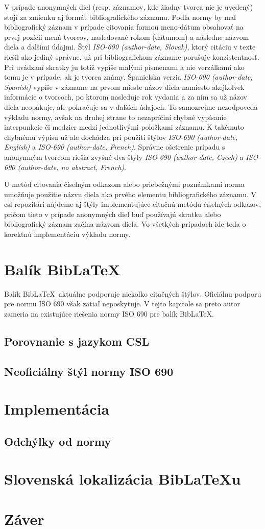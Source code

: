 \documentclass{fithesis3}
\begin{document}
	V prípade anonymných diel (resp. záznamov, kde žiadny tvorca nie je uvedený) stojí za zmienku aj formát bibliografického záznamu. Podľa normy by mal bibliografický záznam v prípade citovania formou meno-dátum obsahovať na prvej pozícii mená tvorcov, nasledované rokom (dátumom) a následne názvom diela a ďalšími údajmi. Štýl \textit{ISO-690 (author-date, Slovak)}, ktorý citáciu v texte riešil ako jediný správne, už pri bibliografickom zázname porušuje konzistentnosť. Pri uvádzaní skratky  ju totiž vypíše malými písmenami a nie verzálkami ako tomu je v prípade, ak je tvorca známy. Španielska verzia \textit{ISO-690 (author-date, Spanish)} vypíše v zázname na prvom mieste názov diela namiesto akejkoľvek informácie o tvorcoch, po ktorom nasleduje rok vydania a za ním sa už názov diela neopakuje, ale pokračuje sa v ďalších údajoch. To samozrejme nezodpovedá výkladu normy, avšak na druhej strane to nezapríčiní chybné vypísanie interpunkcie či medzier medzi jednotlivými položkami záznamu. K takémuto chybnému výpisu už ale dochádza pri použití štýlov \textit{ISO-690 (author-date, English)} a \textit{ISO-690 (author-date, French)}. Správne ošetrenie prípadu s anonymným tvorcom riešia zvyšné dva štýly \textit{ISO-690 (author-date, Czech)} a \textit{ISO-690 (author-date, no abstract, French)}.
	
	U metód citovania číselným odkazom alebo priebežnými poznámkami norma umožňuje použitie názvu diela ako prvého elementu bibliografického záznamu. V csl repozitári nájdeme aj štýly implementujúce citačnú metódu číselných odkazov, pričom tieto v prípade anonymných diel buď používajú skratku  alebo bibliografický záznam začína názvom diela. Vo všetkých prípadoch ide teda o korektnú implementáciu výkladu normy.
	
\chapter{Balík Bib\LaTeX}
Balík Bib\LaTeX\, aktuálne podporuje niekoľko citačných štýlov. Oficiálnu podporu pre normu ISO 690 však zatiaľ neposkytuje. V tejto kapitole sa preto autor zameria na existujúce riešenia normy ISO 690 pre balík Bib\LaTeX.

	\section{Porovnanie s jazykom CSL}
	\section{Neoficiálny štýl normy ISO 690}

\chapter{Implementácia}
	\section{Odchýlky od normy}

\chapter{Slovenská lokalizácia Bib\LaTeX u}

\chapter{Záver}
\end{document}

